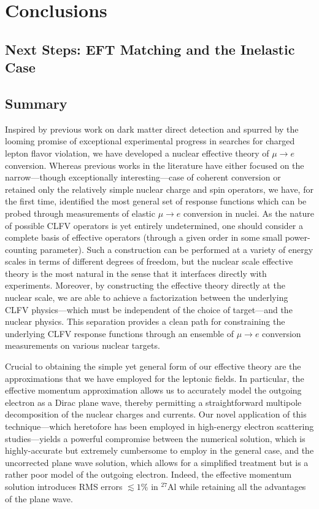 \documentclass{book}[letterpaper,12pt]
\begin{document}
\chapter{Conclusions}
\label{chap:conclusion}
\thispagestyle{headings}
\section{Next Steps: EFT Matching and the Inelastic Case}
\section{Summary}
Inspired by previous work on dark matter direct detection \cite{Fitzpatrick_2013} and spurred by the looming promise of exceptional experimental progress in searches for charged lepton flavor violation, we have developed a nuclear effective theory of $\mu\rightarrow e$ conversion. Whereas previous works in the literature have either focused on the narrow---though exceptionally interesting---case of coherent conversion or retained only the relatively simple nuclear charge and spin operators, we have, for the first time, identified the most general set of response functions which can be probed through measurements of elastic $\mu\rightarrow e$ conversion in nuclei. As the nature of possible CLFV operators is yet entirely undetermined, one should consider a complete basis of effective operators (through a given order in some small power-counting parameter). Such a construction can be performed at a variety of energy scales in terms of different degrees of freedom, but the nuclear scale effective theory is the most natural in the sense that it interfaces directly with experiments. Moreover, by constructing the effective theory directly at the nuclear scale, we are able to achieve a factorization between the underlying CLFV physics---which must be independent of the choice of target---and the nuclear physics. This separation provides a clean path for constraining the underlying CLFV response functions through an ensemble of $\mu\rightarrow e$ conversion measurements on various nuclear targets. 

Crucial to obtaining the simple yet general form of our effective theory are the approximations that we have employed for the leptonic fields. In particular, the effective momentum approximation allows us to accurately model the outgoing electron as a Dirac plane wave, thereby permitting a straightforward multipole decomposition of the nuclear charges and currents. Our novel application of this technique---which heretofore has been employed in high-energy electron scattering studies---yields a powerful compromise between the numerical solution, which is highly-accurate but extremely cumbersome to employ in the general case, and the uncorrected plane wave solution, which allows for a simplified treatment but is a rather poor model of the outgoing electron. Indeed, the effective momentum solution introduces RMS errors $\lesssim 1\%$ in $^{27}$Al while retaining all the advantages of the plane wave.
\end{document}

